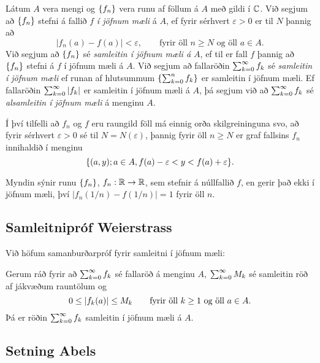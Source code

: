 \begin{sk}
Látum $A$ vera mengi og ${\{f_n\}}$ vera runu af föllum á $A$ með
gildi í ${\mathbb C}$.  Við segjum að ${\{f_n\}}$ stefni á fallið $f$ {\it í jöfnum
mæli} á $A$, ef fyrir sérhvert $\varepsilon>0$ er til $N$ þannig að
$$|f_n(a)-f(a)|<\varepsilon, \qquad 
\text{fyrir öll $n\geq N$ og öll $a\in A$.}
$$
Við segjum að ${\{f_n\}}$  sé {\it samleitin í jöfnum mæli á $A$}, 
ef til er fall
$f$ þannig að ${\{f_n\}}$ stefni á $f$ í jöfnum mæli á $A$.  Við
segjum að fallaröðin $\sum_{k=0}\sp\infty f_k$ sé {\it samleitin í jöfnum
mæli} ef runan af hlutsummum ${\{\sum_{k=0}\sp n f_k\}}$ er samleitin
í jöfnum mæli.  Ef fallaröðin $\sum_{k=0}\sp\infty |f_k|$
er samleitin í jöfnum mæli á $A$, þá segjum við að
$\sum_{k=0}\sp\infty f_k$  sé {\it alsamleitin í jöfnum
mæli} á
menginu $A$.
\end{sk}

\medskip
Í því tilfelli að $f_n$ og $f$ eru raungild föll 
má einnig orða skilgreininguna svo, að fyrir sérhvert $\varepsilon>0$
sé til $N=N(\varepsilon)$, þannig fyrir öll $n\geq N$ er graf fallsins 
$f_n$ innihaldið í menginu 
$${\{(a,y); a\in A, f(a)-\varepsilon<y<f(a)+\varepsilon\}}.
$$

\begin{sy} 
Myndin sýnir runu ${\{f_n\}}$, $f_n:{\mathbb R}\to {\mathbb R}$, sem stefnir á
núllfallið $f$, en gerir það ekki í jöfnum mæli, því
$|f_n(1/n)-f(1/n)|=1$ fyrir öll $n$.  

\end{sy}


\subsection*{Samleitnipróf Weierstrass}

Við höfum  samanburðarpróf fyrir samleitni í jöfnum mæli:

\begin{se}  Gerum ráð
fyrir að $\sum_{k=0}\sp 
\infty f_k$ sé fallaröð á menginu $A$,  $\sum_{k=0}\sp
\infty M_k$ sé samleitin röð af jákvæðum rauntölum og 
$$0\leq |f_k(a)| \leq M_k \qquad \text{fyrir öll  $k\geq 1$ og öll $
a\in A$.}
$$
Þá er röðin $\sum_{k=0}\sp \infty f_k$ samleitin í jöfnum mæli á
$A$.
\end{se}


\subsection*{Setning Abels}


